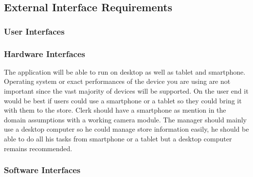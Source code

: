 
\subsection{External Interface Requirements}

\subsubsection{User Interfaces}



\subsubsection{Hardware Interfaces}


The application will be able to run on desktop as well as tablet and smartphone. Operating system or exact performances of the device you are using are not important since the vast majority of devices will be supported. On the user end it would be best if users could use a smartphone or a tablet so they could bring it with them to the store. Clerk should have a smartphone as mention in the domain assumptions with a working camera module. The manager should mainly use a desktop computer so he could manage store information easily, he should be able to do all his tasks from smartphone or a tablet but a desktop computer remains recommended.

\subsubsection{Software Interfaces}

